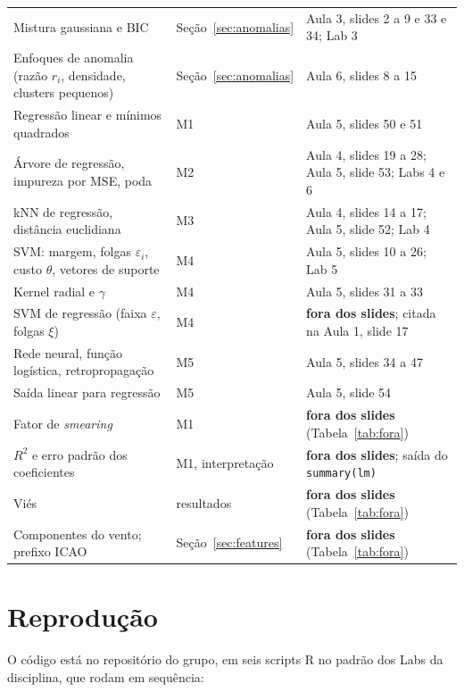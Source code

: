 \documentclass[12pt,a4paper]{article}
\begin{document}
{\begin{longtable}{p{4.6cm}p{4.6cm}p{5.0cm}}
Mistura gaussiana e BIC & Seção~\ref{sec:anomalias} & Aula 3, slides 2 a 9 e 33 e 34; Lab 3\\
Enfoques de anomalia (razão $r_i$, densidade, clusters pequenos) & Seção~\ref{sec:anomalias} & Aula 6, slides 8 a 15\\
Regressão linear e mínimos quadrados & M1 & Aula 5, slides 50 e 51\\
Árvore de regressão, impureza por MSE, poda & M2 & Aula 4, slides 19 a 28; Aula 5, slide 53; Labs 4 e 6\\
kNN de regressão, distância euclidiana & M3 & Aula 4, slides 14 a 17; Aula 5, slide 52; Lab 4\\
SVM: margem, folgas $\varepsilon_i$, custo $\theta$, vetores de suporte & M4 & Aula 5, slides 10 a 26; Lab 5\\
Kernel radial e $\gamma$ & M4 & Aula 5, slides 31 a 33\\
SVM de regressão (faixa $\varepsilon$, folgas $\xi$) & M4 & \textbf{fora dos slides}; citada na Aula 1, slide 17\\
Rede neural, função logística, retropropagação & M5 & Aula 5, slides 34 a 47\\
Saída linear para regressão & M5 & Aula 5, slide 54\\
Fator de \textit{smearing} & M1 & \textbf{fora dos slides} (Tabela~\ref{tab:fora})\\
$R^2$ e erro padrão dos coeficientes & M1, interpretação & \textbf{fora dos slides}; saída do \texttt{summary(lm)}\\
Viés & resultados & \textbf{fora dos slides} (Tabela~\ref{tab:fora})\\
Componentes do vento; prefixo ICAO & Seção~\ref{sec:features} & \textbf{fora dos slides} (Tabela~\ref{tab:fora})\\
\end{longtable}
}

\section{Reprodução}

O código está no repositório do grupo, em seis scripts R no padrão dos Labs da disciplina, que rodam em sequência:
\end{document}
